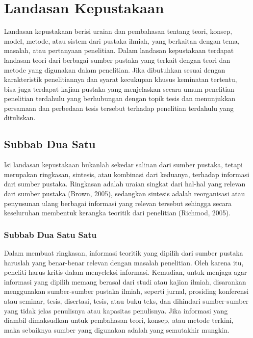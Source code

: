\newpage
\chapter{Landasan Kepustakaan}

Landasan kepustakaan berisi uraian dan pembahasan tentang teori, konsep, model, metode, atau sistem dari pustaka ilmiah, yang berkaitan dengan tema, masalah, atau pertanyaan penelitian. Dalam landasan kepustakaan terdapat landasan teori dari berbagai sumber pustaka yang terkait dengan teori dan metode yang digunakan dalam penelitian. Jika dibutuhkan sesuai dengan karakteristik penelitiannya dan syarat kecukupan khusus keminatan tertentu, bisa juga terdapat kajian pustaka yang menjelaskan secara umum penelitian-penelitian terdahulu yang berhubungan dengan topik tesis dan menunjukkan persamaan dan perbedaan tesis tersebut terhadap penelitian terdahulu yang dituliskan. 

\section{Subbab Dua Satu}

Isi landasan kepustakaan bukanlah sekedar salinan dari sumber pustaka, tetapi merupakan ringkasan, sintesis, atau kombinasi dari keduanya, terhadap informasi dari sumber pustaka. Ringkasan adalah uraian singkat dari hal-hal yang relevan dari sumber pustaka (Brown, 2005), sedangkan sintesis adalah reorganisasi atau penyusunan ulang berbagai informasi yang relevan tersebut sehingga secara keseluruhan membentuk kerangka teoritik dari penelitian (Richmod, 2005).

\subsection{Subbab Dua Satu Satu}

Dalam membuat ringkasan, informasi teoritik yang dipilih dari sumber pustaka haruslah yang benar-benar relevan dengan masalah penelitian. Oleh karena itu, peneliti harus kritis dalam menyeleksi informasi. Kemudian, untuk menjaga agar informasi yang dipilih memang berasal dari studi atau kajian ilmiah, disarankan menggunakan sumber-sumber pustaka ilmiah, seperti jurnal, prosiding konferensi atau seminar, tesis, disertasi, tesis, atau buku teks, dan dihindari sumber-sumber yang tidak jelas penulisnya atau kapasitas penulisnya. Jika informasi yang diambil dimaksudkan untuk pembahasan teori, konsep, atau metode terkini, maka sebaiknya sumber yang digunakan adalah yang semutakhir mungkin.

